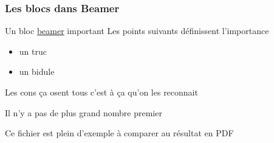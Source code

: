 
\begin{frame}[fragile]
  \frametitle{Les blocs dans Beamer}

  
  \begin{block}{Un bloc \href{https://ctan.org/pkg/beamer}{beamer} important}
    Les points suivants définissent l'importance

    \begin{itemize}
    \item un truc
    \item un bidule
    \end{itemize}
    
  \end{block}

  \pause %


  \begin{definition}
    Les cons ça osent tous c'est à ça qu'on les reconnait
  \end{definition}

  \begin{theorem}
    Il n'y a pas de plus grand nombre premier
  \end{theorem}

  \begin{example}
    Ce fichier est plein d'exemple à comparer au résultat en PDF
  \end{example}
\end{frame}



